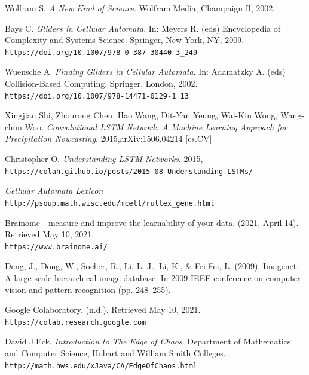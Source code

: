 \documentclass[12pt]{article}
\numberwithin{figure}{section} %
\begin{document}
\begin{thebibliography}{9}
Wolfram S.
\textit{A New Kind of Science}. 
Wolfram Media, Champaign Il, 2002. 

Bays C.
\textit{Gliders in Cellular Automata}. 
In: Meyers R. (eds) Encyclopedia of Complexity and Systems Science. Springer, New York, NY, 2009.
\\\texttt{https://doi.org/10.1007/978-0-387-30440-3\_249}

Wuensche A.
\textit{Finding Gliders in Cellular Automata}. 
In: Adamatzky A. (eds) Collision-Based Computing. Springer, London, 2002. 
\\\texttt{https://doi.org/10.1007/978-14471-0129-1\_13}

Xingjian Shi, Zhourong Chen, Hao Wang, Dit-Yan Yeung, Wai-Kin Wong, Wang-chun Woo. 
\textit{Convolutional LSTM Network: A Machine Learning Approach for Precipitation Nowcasting}. 
2015,arXiv:1506.04214 [cs.CV]

Christopher O.
\textit{Understanding LSTM Networks}. 
2015, \\\texttt{https://colah.github.io/posts/2015-08-Understanding-LSTMs/}

\textit{Cellular Automata Lexicon}
\\\texttt{http://psoup.math.wisc.edu/mcell/rullex\_gene.html}

Brainome - measure and improve the learnability of your data. (2021, April 14). Retrieved May 10, 2021. 
\\\texttt{https://www.brainome.ai/}

Deng, J., Dong, W., Socher, R., Li, L.-J., Li, K., \& Fei-Fei, L. (2009). Imagenet: A large-scale hierarchical image database. In 2009 IEEE conference on computer vision and pattern recognition (pp. 248–255).

Google Colaboratory. (n.d.). Retrieved May 10, 2021. 
\\\texttt{https://colab.research.google.com}

David J.Eck.
\textit{Introduction to The Edge of Chaos}.
Department of Mathematics and Computer Science, Hobart and William Smith Colleges. 
\\\texttt{http://math.hws.edu/xJava/CA/EdgeOfChaos.html}


\end{thebibliography}
\end{document}
